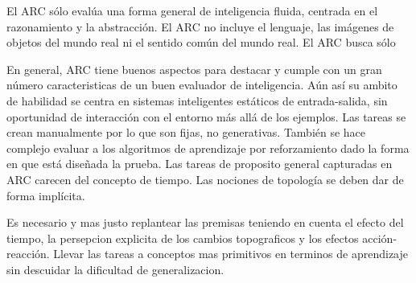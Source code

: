 El ARC sólo evalúa una forma general de inteligencia fluida, centrada en el razonamiento y la abstracción. El ARC no incluye el lenguaje, las imágenes de objetos del mundo real ni el sentido común del mundo real. El ARC busca sólo

En general, ARC tiene buenos aspectos para destacar y cumple con un gran número caracteristicas de un buen evaluador de inteligencia. Aún así su ambito de habilidad se centra en sistemas inteligentes estáticos de entrada-salida, sin oportunidad de interacción con el entorno más allá de los ejemplos. Las tareas se crean manualmente por lo que son fijas, no generativas. También se hace complejo evaluar a los algoritmos de aprendizaje por reforzamiento dado la forma en que está diseñada la prueba. Las tareas de proposito general capturadas en ARC carecen del concepto de tiempo. Las nociones de topología se deben dar de forma implícita. 


Es necesario y mas justo replantear las premisas teniendo en cuenta el efecto del tiempo, la persepcion explicita de los cambios topograficos y los efectos acción-reacción. Llevar las tareas a conceptos mas primitivos en terminos de aprendizaje sin descuidar la dificultad de generalizacion.